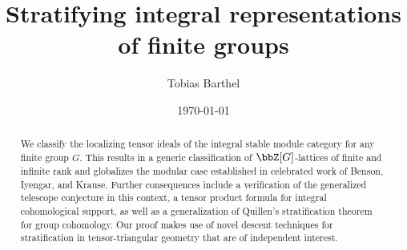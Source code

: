 \documentclass{amsart}%
\numberwithin{equation}{section}%
\theoremstyle{remark}
\begin{document}


\title[Integral stratification]{Stratifying integral representations \\ of finite groups}


\author{Tobias Barthel}

\date{\today}

\makeatletter
\patchcmd{\@setaddresses}{\indent}{\noindent}{}{}
\patchcmd{\@setaddresses}{\indent}{\noindent}{}{}
\patchcmd{\@setaddresses}{\indent}{\noindent}{}{}
\patchcmd{\@setaddresses}{\indent}{\noindent}{}{}
\makeatother

\address{Tobias Barthel, Max Planck Institute for Mathematics, Vivatsgasse 7, 53111 Bonn, Germany}

\begin{abstract}
We classify the localizing tensor ideals of the integral stable module category for any finite group $G$. This results in a generic classification of $\bbZ[G]$-lattices of finite and infinite rank and globalizes the modular case established in celebrated work of Benson, Iyengar, and Krause. Further consequences include a verification of the generalized telescope conjecture in this context, a tensor product formula for integral cohomological support, as well as a generalization of Quillen's stratification theorem for group cohomology. Our proof makes use of novel descent techniques for stratification in tensor-triangular geometry that are of independent interest. 
\vspace{-1em}
\end{abstract}


\maketitle
\end{document}
